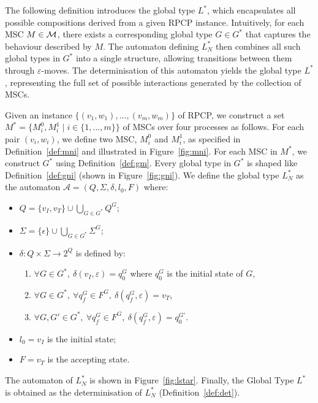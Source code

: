 The following definition introduces the global type $L^*$, which
encapsulates all possible compositions derived from a given RPCP instance.
Intuitively, for each MSC $M \in \mathcal{M}$, there exists a corresponding
global type $G \in G^*$ that captures the behaviour described by $M$.
The automaton defining $L^*_N$ then combines all such global types in $G^*$
into a single structure, allowing transitions between them through
$\varepsilon$-moves. The determinisation of this automaton yields the
global type $L^*$, representing the full set of possible interactions
generated by the collection of MSCs.

\bigskip

\begin{definition}\label{def:lstar}
	Given an instance $\{(v_1, w_1), \ldots, (v_m, w_m)\}$ of RPCP, we
	construct a set $M^* = \{M_i^0, M_i^1 \mid i \in \{1, \ldots, m\}\}$ of
	MSCs over four processes as follows. For each pair $(v_i, w_i)$,
	we define two MSC, $M_i^0$ and $M_i^1$, as specified in
	Definition~\ref{def:mni} and illustrated in Figure~\ref{fig:mni}.
	For each MSC in $M^*$, we construct $G^*$ using Definition~\ref{def:gm}.
	Every global type in $G^*$ is shaped like Definition~\ref{def:gni} 
	(shown in Figure~\ref{fig:gni}).
	We define the global type $L^*_{N}$ as the automaton
	$\mathcal A = (Q,\Sigma, \delta, l_0, F)$ where:
	\begin{itemize}
		\item $Q = \{v_I,v_T\}\cup \bigcup_{G\in G^*} Q^G$;
		\item $\Sigma = \{\epsilon\}\cup\bigcup_{G\in G^*} \Sigma^G$;
		\item $\delta: Q \times \Sigma \rightarrow 2^Q$ is defined by:
			      \begin{enumerate}
				       \item $\forall G \in G^*,\ \delta(v_I, \varepsilon) = q_0^G$ where $q_0^G$ is the initial state of $G$,
				       \item $\forall G \in G^*,\ \forall q_f^G \in F^G,\ \delta(q_f^G, \varepsilon) = v_T$,
				       \item $\forall G, G' \in G^*,\ \forall q_f^G \in F^G,\ \delta(q_f^G, \varepsilon) = q_0^{G'}$.
			      \end{enumerate}
		\item $l_0 = v_I$ is the initial state;
		\item $F = v_T$ is the accepting state.
	\end{itemize}
	The automaton of $L^*_{N}$ is shown in Figure~\ref{fig:lstar}.  
	Finally, the Global Type $L^*$ is obtained as the determinisation 
	of $L^*_{N}$ (Definition~\ref{def:det}).
\end{definition}

